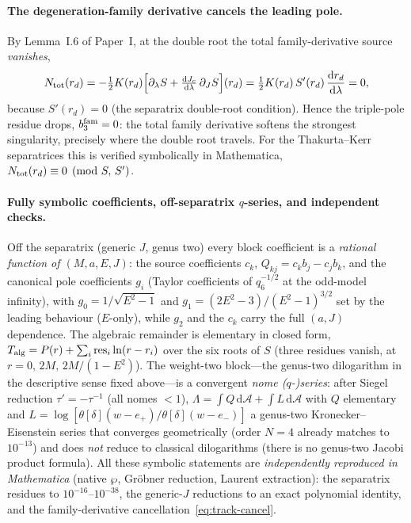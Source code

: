 \documentclass[12pt]{iopart}
\theoremstyle{plain}
\theoremstyle{definition}
\theoremstyle{remark}
\newcommand{\Jc}{J_{c}}
\newcommand{\dd}{\mathrm{d}}
\begin{document}
\paragraph{The degeneration-family derivative cancels the leading pole.}
By Lemma~I.6 of Paper~I, at the double root the total family-derivative source \emph{vanishes},
\begin{equation}
N_{\rm tot}(r_d)=-\tfrac12K(r_d)\Big[\partial_\lambda S
+\tfrac{\dd\Jc}{\dd\lambda}\,\partial_JS\Big](r_d)
=\tfrac12K(r_d)\,S'(r_d)\,\frac{\dd r_d}{\dd\lambda}=0,
\label{eq:track-cancel}
\end{equation}
because $S'(r_d)=0$ (the separatrix double-root condition). Hence the triple-pole
residue drops, $b_3^{\rm fam}=0$: the total family derivative softens the
strongest singularity, precisely where the double root travels. For the Thakurta--Kerr
separatrices this is verified symbolically in Mathematica,
$N_{\rm tot}(r_d)\equiv0\pmod{S,\,S'}$.

\paragraph{Fully symbolic coefficients, off-separatrix $q$-series, and independent checks.}
Off the separatrix (generic $J$, genus two) every block coefficient is a
\emph{rational function of $(M,a,E,J)$}: the source coefficients $c_k$,
$Q_{kj}=c_kb_j-c_jb_k$, and the canonical pole coefficients $g_i$ (Taylor
coefficients of $q_6^{-1/2}$ at the odd-model infinity), with
$g_0=1/\sqrt{E^2-1}$ and $g_1=(2E^2-3)/(E^2-1)^{3/2}$ set by the leading behaviour
($E$-only), while $g_2$ and the $c_k$ carry the full $(a,J)$ dependence. The
algebraic remainder is elementary in closed form,
$T_{\rm alg}=P(r)+\sum_i\mathrm{res}_i\ln(r-r_i)$ over the six roots of $S$
(three residues vanish, at $r=0,\,2M,\,2M/(1-E^2)$). The weight-two block---the
genus-two dilogarithm in the descriptive sense fixed above---is a
convergent \emph{nome ($q$-)series}: after Siegel reduction $\tau'=-\tau^{-1}$ (all
nomes ${<}1$), $\Lambda=\int Q\,\dd\mathcal A+\int L\,\dd\mathcal A$ with $Q$
elementary and $L=\log[\theta[\delta](w-e_+)/\theta[\delta](w-e_-)]$ a genus-two
Kronecker--Eisenstein series that converges geometrically (order $N{=}4$ already
matches to $10^{-13}$) and does \emph{not} reduce to classical dilogarithms (there is
no genus-two Jacobi product formula). All these symbolic statements are
\emph{independently reproduced in Mathematica} (native $\wp$, Gröbner reduction,
Laurent extraction): the separatrix residues to $10^{-16}$--$10^{-38}$, the generic-$J$
reductions to an exact polynomial identity, and the family-derivative
cancellation~\eqref{eq:track-cancel}.
\end{document}
